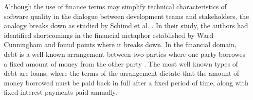 \documentclass{mprop}
\begin{document}
Although the use of finance terms may simplify technical characteristics of
software quality in the dialogue between development teams and stakeholders, the
analogy breaks down as studied by Schimd et al. \cite{Schmid2013}. In their
study, the authors had identified shortcomings in the financial metaphor
established by Ward Cunningham \cite{Cunningham1993} and found points where it
breaks down. In the financial domain, debt is a well known arrangement between
two parties where one party borrowes a fixed amount of money from the other
party \cite{debt-investopedia}. The most well known types of debt are loans,
where the terms of the arrangement dictate that the amount of money borrowed
must be paid back in full after a fixed period of time, along with fixed
interest payments paid annually.
\end{document}
